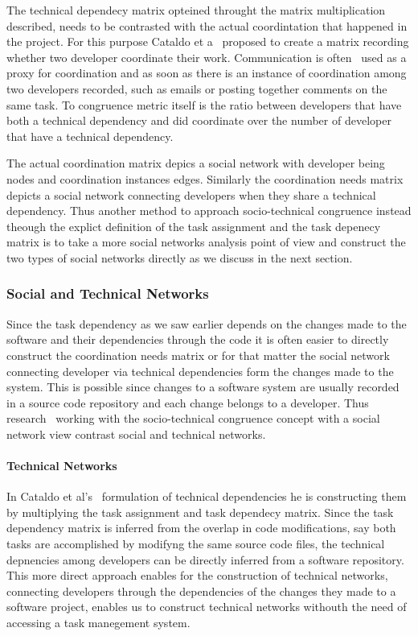 The technical dependecy matrix opteined throught the matrix multiplication described, needs to be contrasted with the actual coordintation that happened in the project.
For this purpose Cataldo et a~\cite{} proposed to create a matrix recording whether two developer coordinate their work.
Communication is often~\cite{} used as a proxy for coordination and as soon as there is an instance of coordination among two developers recorded, such as emails or posting together comments on the same task.
To congruence metric itself is the ratio between developers that have both a technical dependency and did coordinate over the number of developer that have a technical dependency.

The actual coordination matrix depics a social network with developer being nodes and coordination instances edges.
Similarly the coordination needs matrix depicts a social network connecting developers when they share a technical dependency.
Thus another method to approach socio-technical congruence instead theough the explict definition of the task assignment and the task depenecy matrix is to take a more social networks analysis point of view and construct the two types of social networks directly as we discuss in the next section.

\subsubsection{Social and Technical Networks}
Since the task dependency as we saw earlier depends on the changes made to the software and their dependencies through the code it is often easier to directly construct the coordination needs matrix or for that matter the social network connecting developer via technical dependencies form the changes made to the system.
This is possible since changes to a software system are usually recorded in a source code repository and each change belongs to a developer.
Thus research~\cite{} working with the socio-technical congruence concept with a social network view contrast social and technical networks.

\paragraph{Technical Networks}
In Cataldo et al's~\cite{} formulation of technical dependencies he is constructing them by multiplying the task assignment and task dependecy matrix.
Since the task dependency matrix is inferred from the overlap in code modifications, say both tasks are accomplished by modifyng the same source code files, the technical depnencies among developers can be directly inferred from a software repository.
This more direct approach enables for the construction of technical networks, connecting developers through the dependencies of the changes they made to a software project, enables us to construct technical networks withouth the need of accessing a task manegement system.

